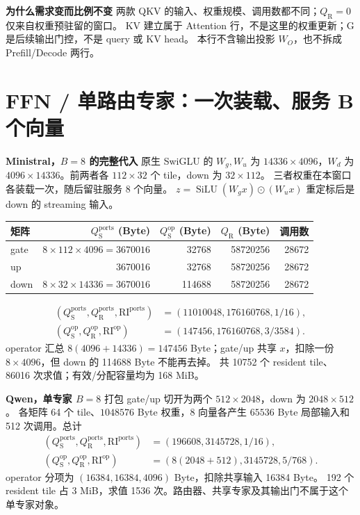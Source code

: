 \documentclass[11pt,a4paper,fontset=fandol]{ctexart}
\newcommand{\qs}{Q_{\mathrm S}}
\newcommand{\qr}{Q_{\mathrm R}}
\newcommand{\RI}{\mathrm{RI}}
\newcommand{\op}{\mathrm{op}}
\newcommand{\loc}{\mathrm{ports}}
\newcommand{\para}[1]{\par\smallskip\noindent\textbf{#1}\quad}
\begin{document}
\para{为什么需求变而比例不变}
两款 QKV 的输入、权重规模、调用数都不同；$\qr=0$ 仅来自权重预驻留的窗口。
KV 建立属于 Attention 行，不是这里的权重更新；G 是后续输出门控，不是 query 或 KV head。
本行不含输出投影 $W_O$，也不拆成 Prefill/Decode 两行。

\clearpage
\section{FFN / 单路由专家：一次装载、服务 B 个向量}
\para{Ministral，$B=8$ 的完整代入}
原生 SwiGLU 的 $W_g,W_u$ 为 $14336\times4096$，$W_d$ 为
$4096\times14336$。前两者各 $112\times32$ 个 tile，down 为 $32\times112$。
三者权重在本窗口各装载一次，随后留驻服务 8 个向量。
$z=\operatorname{SiLU}(W_gx)\odot(W_ux)$ 重定标后是 down 的 streaming 输入。
\begin{center}\small
\begin{tabular}{@{}lrrrr@{}}\toprule
矩阵 & $\qs^{\loc}$ (Byte) & $\qs^{\op}$ (Byte) & $\qr$ (Byte) & 调用数\\\midrule
gate & $8\times112\times4096=3670016$ & 32768 & 58720256 & 28672\\
up & 3670016 & 32768 & 58720256 & 28672\\
down & $8\times32\times14336=3670016$ & 114688 & 58720256 & 28672\\\bottomrule
\end{tabular}\end{center}
\begin{align*}
(\qs^{\loc},\qr^{\loc},\RI^{\loc})&=(11010048,176160768,1/16),\\
(\qs^{\op},\qr^{\op},\RI^{\op})&=(147456,176160768,3/3584).
\end{align*}
operator 汇总 $8(4096+14336)=147456$ Byte；gate/up 共享 $x$，扣除一份
$8\times4096$，但 down 的 114688 Byte 不能再去掉。
共 10752 个 resident tile、86016 次求值；有效/分配容量均为 168 MiB。

\para{Qwen，单专家 $B=8$}
打包 gate/up 切开为两个 $512\times2048$，down 为 $2048\times512$。
各矩阵 64 个 tile、$1048576$ Byte 权重，8 向量各产生
$65536$ Byte 局部输入和 512 次调用。总计
\begin{align*}
(\qs^{\loc},\qr^{\loc},\RI^{\loc})&=(196608,3145728,1/16),\\
(\qs^{\op},\qr^{\op},\RI^{\op})&=(8(2048+512),3145728,5/768).
\end{align*}
operator 分项为 $(16384,16384,4096)$ Byte，扣除共享输入 16384 Byte。
192 个 resident tile 占 3 MiB，求值 1536 次。路由器、共享专家及其输出门不属于这个单专家对象。
\end{document}
